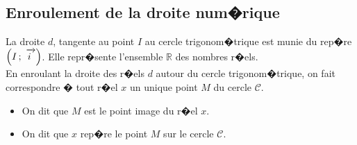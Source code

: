 \documentclass[11pt,dvips]{article}
\newcommand{\R}{\mathbb{R}}
\newcommand{\vect}[1]{\mathchoice%
{\overrightarrow{\displaystyle\mathstrut#1\,\,}}%
{\overrightarrow{\textstyle\mathstrut#1\,\,}}%
{\overrightarrow{\scriptstyle\mathstrut#1\,\,}}%
{\overrightarrow{\scriptscriptstyle\mathstrut#1\,\,}}}
\theoremstyle{break}
\theoremstyle{nonumberbreak}
\begin{document}
\subsection{Enroulement de la droite num�rique}
La droite $d$, tangente au point $I$ au cercle trigonom�trique est munie du rep�re $\left(I\, ;~\vect{i}\right)$. 
Elle repr�sente l'ensemble $\R$ des nombres r�els.\\
En enroulant la droite des r�els $d$ autour du cercle trigonom�trique, on fait correspondre � tout r�el $x$ un unique point $M$ du cercle $\mathcal{C}$.
\begin{Def}
\begin{itemize}
\item On dit que $M$ est le point image du r�el $x$.
\item On dit que $x$ rep�re le point $M$ sur le cercle $\mathcal{C}$.
\end{itemize}
\end{Def}
\end{document}
